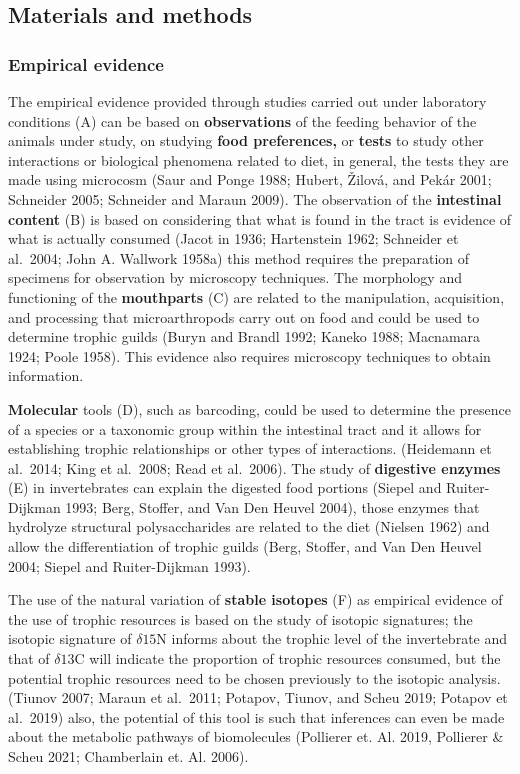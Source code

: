 \documentclass[10pt,oneside]{article}
\begin{document}
\hypertarget{materials-and-methods}{%
\subsection{Materials and methods}\label{materials-and-methods}}

\hypertarget{empirical-evidence}{%
\subsubsection{Empirical evidence}\label{empirical-evidence}}

The empirical evidence provided through studies carried out under
laboratory conditions (A) can be based on \textbf{observations} of the
feeding behavior of the animals under study, on studying \textbf{food
preferences,} or \textbf{tests} to study other interactions or
biological phenomena related to diet, in general, the tests they are
made using microcosm (Saur and Ponge 1988; Hubert, Žilová, and Pekár
2001; Schneider 2005; Schneider and Maraun 2009). The observation of the
\textbf{intestinal content} (B) is based on considering that what is
found in the tract is evidence of what is actually consumed (Jacot in
1936; Hartenstein 1962; Schneider et al.~2004; John A. Wallwork 1958a)
this method requires the preparation of specimens for observation by
microscopy techniques. The morphology and functioning of the
\textbf{mouthparts} (C) are related to the manipulation, acquisition,
and processing that microarthropods carry out on food and could be used
to determine trophic guilds (Buryn and Brandl 1992; Kaneko 1988;
Macnamara 1924; Poole 1958). This evidence also requires microscopy
techniques to obtain information.

\textbf{Molecular} tools (D), such as barcoding, could be used to
determine the presence of a species or a taxonomic group within the
intestinal tract and it allows for establishing trophic relationships or
other types of interactions. (Heidemann et al.~2014; King et al.~2008;
Read et al.~2006). The study of \textbf{digestive enzymes} (E) in
invertebrates can explain the digested food portions (Siepel and
Ruiter-Dijkman 1993; Berg, Stoffer, and Van Den Heuvel 2004), those
enzymes that hydrolyze structural polysaccharides are related to the
diet (Nielsen 1962) and allow the differentiation of trophic guilds
(Berg, Stoffer, and Van Den Heuvel 2004; Siepel and Ruiter-Dijkman
1993).

The use of the natural variation of \textbf{stable isotopes} (F) as
empirical evidence of the use of trophic resources is based on the study
of isotopic signatures; the isotopic signature of \(\delta\text{15N}\)
informs about the trophic level of the invertebrate and that of
\(\delta\text{13C}\) will indicate the proportion of trophic resources
consumed, but the potential trophic resources need to be chosen
previously to the isotopic analysis. (Tiunov 2007; Maraun et al.~2011;
Potapov, Tiunov, and Scheu 2019; Potapov et al.~2019) also, the
potential of this tool is such that inferences can even be made about
the metabolic pathways of biomolecules (Pollierer et. Al. 2019,
Pollierer \& Scheu 2021; Chamberlain et. Al. 2006).
\end{document}
